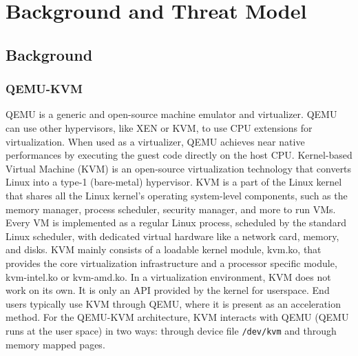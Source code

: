 \section{Background and Threat Model}%
\label{sec:background_and_threat_model}



\subsection{Background}%
\label{sub:background}

\subsubsection{QEMU-KVM}%
\label{ssub:qemu_kvm}
QEMU is a generic and open-source machine emulator and virtualizer. QEMU can use other hypervisors, like XEN or KVM, to use CPU extensions for virtualization. When used as a virtualizer, QEMU achieves near native performances by executing the guest code directly on the host CPU.
Kernel-based Virtual Machine (KVM) is an open-source virtualization technology that converts Linux into a type-1 (bare-metal) hypervisor. KVM is a part of the Linux kernel that shares all the Linux kernel's operating system-level components, such as the memory manager, process scheduler, security manager, and more to run VMs. Every VM is implemented as a regular Linux process, scheduled by the standard Linux scheduler, with dedicated virtual hardware like a network card, memory, and disks. KVM mainly consists of a loadable kernel module, kvm.ko, that provides the core virtualization infrastructure and a processor specific module, kvm-intel.ko or kvm-amd.ko.
In a virtualization environment, KVM does not work on its own. It is only an API provided by the kernel for userspace. End users typically use KVM through QEMU, where it is present as an acceleration method.
For the QEMU-KVM architecture, KVM interacts with QEMU (QEMU runs at the user space) in two ways: through device file \verb|/dev/kvm| and through memory mapped pages.

